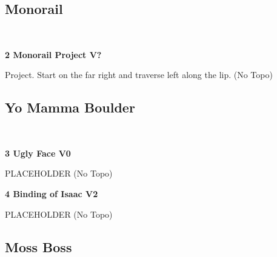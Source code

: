 \begin{multicols}{2}
\begin{minipage}{\columnwidth}
			\subsection*{Monorail}\label{bf:Monorail}
			\
			
			\end{minipage}
			
					\begin{minipage}{\linewidth}	
					\label{rt:Monorail Project}
\colorbox{black!20}{
\parbox{0.95\textwidth}{
\textbf{
2 Monorail Project V?  
}
}
}

					\begin{adjustwidth}{0.5cm}{}				
					Project. Start on the far right and traverse left along the lip.
						\newline (No Topo) 
					\end{adjustwidth}
					\end{minipage}
			\begin{minipage}{\columnwidth}
			\subsection*{Yo Mamma Boulder}\label{bf:Yo Mamma Boulder}
			\
			
			\end{minipage}
			
					\begin{minipage}{\linewidth}	
					\label{rt:Ugly Face}
\colorbox{green!20}{
\parbox{0.95\textwidth}{
\textbf{
3 Ugly Face V0   \warn 
}
}
}

					\begin{adjustwidth}{0.5cm}{}				
					PLACEHOLDER
						\newline (No Topo) 
					\end{adjustwidth}
					\end{minipage}
					\begin{minipage}{\linewidth}	
					\label{rt:Binding of Isaac}
\colorbox{green!20}{
\parbox{0.95\textwidth}{
\textbf{
4 Binding of Isaac V2    \warn 
}
}
}

					\begin{adjustwidth}{0.5cm}{}				
					PLACEHOLDER
						\newline (No Topo) 
					\end{adjustwidth}
					\end{minipage}
			\begin{minipage}{\columnwidth}
			\subsection*{Moss Boss}\label{bf:Moss Boss}
			\
			

\end{minipage}
\end{multicols}
